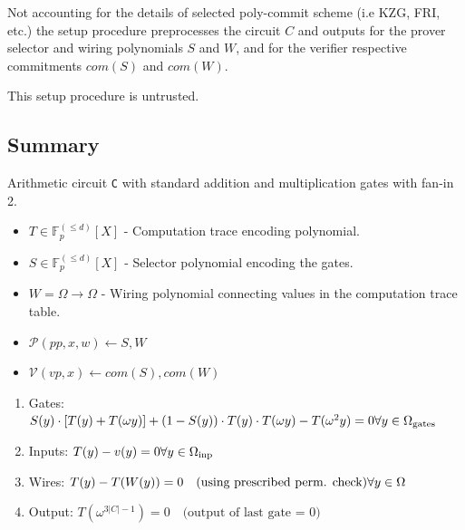 \documentclass[../lecture-notes.tex]{subfiles}
\begin{document}
Not accounting for the details of selected poly-commit scheme (i.e KZG, FRI, etc.) the setup procedure preprocesses the circuit \(C\) and outputs for the prover selector and wiring polynomials \(S\) and \(W\), and for the verifier respective commitments \(com(S)\) and \(com(W)\).

\begin{remark}
This setup procedure is untrusted.
\end{remark}

\subsection{Summary}
\begin{tcolorbox}[title=Plonk,
    colback=blue!5!white,
    colframe=blue!75!black,
    colbacktitle=blue!25!white,
    coltitle=blue!20!black,
    fonttitle=\bfseries,
    boxrule=1.25pt,
    subtitle style={boxrule=0pt,
    colback=blue!20!white,
    colupper=blue!75!gray}]

\small Arithmetic circuit \texttt{C} with standard addition and multiplication gates with fan-in 2.

\begin{itemize}[label=]
    \item \(T \in \mathbb{F}_p^{(\leq d)}[X]\) - Computation trace encoding polynomial.
    \item \(S \in \mathbb{F}_p^{(\leq d)}[X]\) - Selector polynomial encoding the gates.
    \item \(W = \Omega \to \Omega\) - Wiring polynomial connecting values in the computation trace table.
\end{itemize}

\begin{center}
\begin{itemize}[label=]
    \item \(\mathcal{P}(pp, x, w) \leftarrow S, W\)
    \item \(\mathcal{V}(vp, x) \leftarrow com(S), com(W)\)
\end{itemize}
\end{center}

\begin{enumerate}
    \item Gates: \( S(y)\cdot[T(y) + T(\omega y)] + (1-S(y))\cdot T(y)\cdot T(\omega y) - T(\omega^{2}y) = 0 \hfill \forall y \in \Omega_{\text{gates}} \)
    \item Inputs: \( T(y) - v(y) = 0 \hfill \forall y \in \Omega_{\text{inp}} \)
    \item Wires: \( T(y) - T(W(y)) = 0 \quad \text{(using prescribed perm. check)} \hfill \forall y \in \Omega \)
    \item Output: \( T(\omega^{3|C|-1}) = 0 \quad \text{(output of last gate = 0)} \)
\end{enumerate}

\end{tcolorbox}
\end{document}
